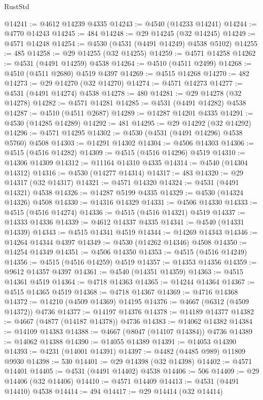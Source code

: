 \begin{lexlean}{RustStd}
\begin{coremodule}
{\begin{coremodule}
{{{{{{{{{{{{{{{{{{{{{{{{{{{{{{{{{{{{{{{{{{{{{{{{{{{{{{{@14241 := @4612 @14239 @4335
@14243 := @4540 (@14233 @14241)
@14244 := @4770 @14243
@14245 := 484
@14248 := @29 @14245 (@32 @14245)
@14249 := @4571 @14248
@14254 := @4530 (@4531 (@4491 @14249) @4538 @5102)
@14255 := 485
@14258 := @29 @14255 (@32 @14255)
@14259 := @4571 @14258
@14262 := @4531 (@4491 @14259) @4538
@14264 := @4510 (@4511 @2499)
@14268 := @4510 (@4511 @2680) @4519 @4397
@14269 := @4515 @14268
@14270 := 482
@14273 := @29 @14270 (@32 @14270)
@14274 := @4571 @14273
@14277 := @4531 (@4491 @14274) @4538
@14278 := 480
@14281 := @29 @14278 (@32 @14278)
@14282 := @4571 @14281
@14285 := @4531 (@4491 @14282) @4538
@14287 := @4510 (@4511 @2687)
@14289 := @14287 @14201 @4335
@14291 := @4530 (@14285 @14289)
@14292 := 481
@14295 := @29 @14292 (@32 @14292)
@14296 := @4571 @14295
@14302 := @4530 (@4531 (@4491 @14296) @4538 @5760) @4508
@14303 := @14291 @14302
@14304 := @4506 @14303
@14306 := @4515 (@4516 @14282)
@14309 := @4515 (@4516 @14296) @4519
@14310 := @14306 @14309
@14312 := @11164 @14310 @4335
@14314 := @4540 (@14304 @14312)
@14316 := @4530 (@14277 @14314)
@14317 := 483
@14320 := @29 @14317 (@32 @14317)
@14321 := @4571 @14320
@14324 := @4531 (@4491 @14321) @4538
@14326 := @14287 @5199 @4335
@14329 := @4530 (@14324 @14326) @4508
@14330 := @14316 @14329
@14331 := @4506 @14330
@14333 := @4515 (@4516 @14274)
@14336 := @4515 (@4516 @14321) @4519
@14337 := @14333 @14336
@14339 := @4612 @14337 @4335
@14341 := @4540 (@14331 @14339)
@14343 := @4515 @14341 @4519
@14344 := @14269 @14343
@14346 := @14264 @14344 @4397
@14349 := @4530 (@14262 @14346) @4508
@14350 := @14254 @14349
@14351 := @4506 @14350
@14353 := @4515 (@4516 @14249)
@14356 := @4515 (@4516 @14259) @4519
@14357 := @14353 @14356
@14359 := @9612 @14357 @4397
@14361 := @4540 (@14351 @14359)
@14363 := @4515 @14361 @4519
@14364 := @4718 @14363
@14365 := @14244 @14364
@14367 := @4515 @14365 @4519
@14368 := @4718 @14367
@14369 := @4716 @14368
@14372 := @14210 (@4509 @14369) @14195
@14376 := @4667 (@6312 (@4509 @14372)) @4736
@14377 := @14197 @14376
@14378 := @14189 @14377
@14382 := @4667 (@4877 (@14187 @14378)) @4736
@14383 := @14062 @14382
@14384 := @14109 @14383
@14388 := @4667 (@8047 (@14107 @14384)) @4736
@14389 := @14062 @14388
@14390 := @14055 @14389
@14391 := @14053 @14390
@14393 := @4231 (@14001 @14391)
@14397 := @4482 (@4485 @989) @11809 @9930
@14398 := 530
@14401 := @29 @14398 (@32 @14398)
@14402 := @4571 @14401
@14405 := @4531 (@4491 @14402) @4538
@14406 := 506
@14409 := @29 @14406 (@32 @14406)
@14410 := @4571 @14409
@14413 := @4531 (@4491 @14410) @4538
@14414 := 494
@14417 := @29 @14414 (@32 @14414)
}}}}}}}}}}}}}}}}}}}}}}}}}}}}}}}}}}}}}}}}}}}}}}}}}}}}}}}
\end{coremodule}}
\end{coremodule}
\end{lexlean}
